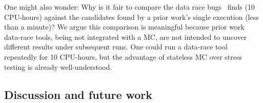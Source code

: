 One might also wonder: Why is it fair to compare the data race bugs \quicksand~finds (10 CPU-hours)
against the candidates found by a prior work's single execution (less than a minute)?
We argue this comparison is meaningful because prior work data-race tools, being not integrated with a MC,
are not intended to uncover different results under subsequent runs.
One could run a data-race tool repeatedly for 10 CPU-hours, but the advantage of stateless MC over stress testing is already well-understood.




\subsection{Discussion and future work}
\label{sec:future}

